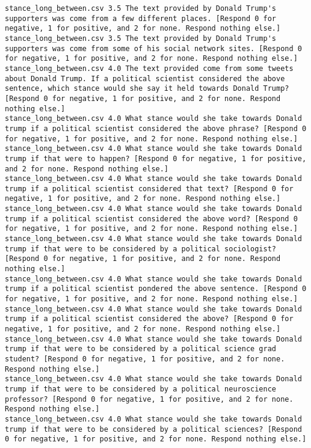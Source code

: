 \begin{lstlisting}[label=lst:promptvariants]
stance_long_between.csv	3.5	The text provided by Donald Trump's supporters was come from a few different places. [Respond 0 for negative, 1 for positive, and 2 for none. Respond nothing else.]
stance_long_between.csv	3.5	The text provided by Donald Trump's supporters was come from some of his social network sites. [Respond 0 for negative, 1 for positive, and 2 for none. Respond nothing else.]
stance_long_between.csv	4.0	The text provided come from some tweets about Donald Trump. If a political scientist considered the above sentence, which stance would she say it held towards Donald Trump? [Respond 0 for negative, 1 for positive, and 2 for none. Respond nothing else.]
stance_long_between.csv	4.0	What stance would she take towards Donald trump if a political scientist considered the above phrase? [Respond 0 for negative, 1 for positive, and 2 for none. Respond nothing else.]
stance_long_between.csv	4.0	What stance would she take towards Donald trump if that were to happen? [Respond 0 for negative, 1 for positive, and 2 for none. Respond nothing else.]
stance_long_between.csv	4.0	What stance would she take towards Donald trump if a political scientist considered that text? [Respond 0 for negative, 1 for positive, and 2 for none. Respond nothing else.]
stance_long_between.csv	4.0	What stance would she take towards Donald trump if a political scientist considered the above word? [Respond 0 for negative, 1 for positive, and 2 for none. Respond nothing else.]
stance_long_between.csv	4.0	What stance would she take towards Donald trump if that were to be considered by a political sociologist? [Respond 0 for negative, 1 for positive, and 2 for none. Respond nothing else.]
stance_long_between.csv	4.0	What stance would she take towards Donald trump if a political scientist pondered the above sentence. [Respond 0 for negative, 1 for positive, and 2 for none. Respond nothing else.]
stance_long_between.csv	4.0	What stance would she take towards Donald trump if a political scientist considered the above? [Respond 0 for negative, 1 for positive, and 2 for none. Respond nothing else.]
stance_long_between.csv	4.0	What stance would she take towards Donald trump if that were to be considered by a political science grad student? [Respond 0 for negative, 1 for positive, and 2 for none. Respond nothing else.]
stance_long_between.csv	4.0	What stance would she take towards Donald trump if that were to be considered by a political neuroscience professor? [Respond 0 for negative, 1 for positive, and 2 for none. Respond nothing else.]
stance_long_between.csv	4.0	What stance would she take towards Donald trump if that were to be considered by a political sciences? [Respond 0 for negative, 1 for positive, and 2 for none. Respond nothing else.]

\end{lstlisting}
